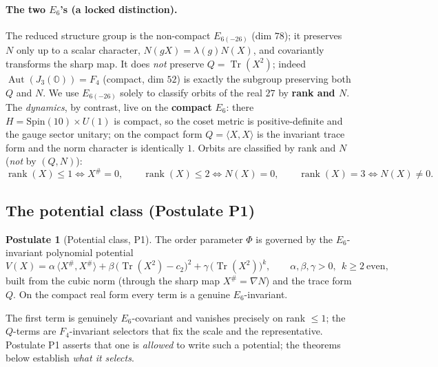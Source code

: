 \documentclass[11pt]{article}
\theoremstyle{plain}
\theoremstyle{definition}
\newtheorem{postulate}[theorem]{Postulate}
\theoremstyle{remark}
\begin{document}
\paragraph{The two $E_6$'s (a locked distinction).}
The reduced structure group is the non-compact $E_{6(-26)}$ (dim $78$); it preserves $N$ only
up to a scalar character, $N(gX)=\lambda(g)N(X)$, and covariantly transforms the sharp map.
It does \emph{not} preserve $Q=\operatorname{Tr}(X^2)$; indeed $\operatorname{Aut}(J_3(\mathbb O))=F_4$
(compact, dim $52$) is exactly the subgroup preserving both $Q$ and $N$. We use $E_{6(-26)}$
solely to classify orbits of the real $27$ by \textbf{rank and $N$}. The \emph{dynamics}, by
contrast, live on the \textbf{compact} $E_6$: there $H=\mathrm{Spin}(10)\times U(1)$ is
compact, so the coset metric is positive-definite and the gauge sector unitary; on the
compact form $Q=\langle X,X\rangle$ is the invariant trace form and the norm character is
identically $1$. Orbits are classified by rank and $N$ (\emph{not} by $(Q,N)$):
\begin{equation}
\label{eq:potential:rank}
\operatorname{rank}(X)\le1\iff X^\#=0,\qquad
\operatorname{rank}(X)\le2\iff N(X)=0,\qquad
\operatorname{rank}(X)=3\iff N(X)\neq0.
\end{equation}

\subsection{The potential class (Postulate P1)}
\label{sec:potential:class}

\begin{postulate}[Potential class, P1]
\label{post:potential:P1}
The order parameter $\Phi$ is governed by the $E_6$-invariant polynomial potential
\begin{equation}
\label{eq:potential:v}
V(X)=\alpha\,\langle X^\#,X^\#\rangle
+\beta\,\bigl(\operatorname{Tr}(X^2)-c_2\bigr)^2
+\gamma\,\bigl(\operatorname{Tr}(X^2)\bigr)^k,
\qquad \alpha,\beta,\gamma>0,\ \ k\ge2\ \text{even},
\end{equation}
built from the cubic norm (through the sharp map $X^\#=\nabla N$) and the trace form $Q$.
On the compact real form every term is a genuine $E_6$-invariant.
\end{postulate}

The first term is genuinely $E_6$-covariant and vanishes precisely on rank $\le1$; the
$Q$-terms are $F_4$-invariant selectors that fix the scale and the representative. Postulate
P1 asserts that one is \emph{allowed} to write such a potential; the theorems below establish
\emph{what it selects}.
\end{document}
